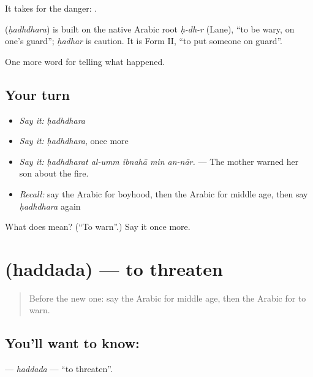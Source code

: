 It takes  for the danger:   .

\begin{cousinweb}
\textbf{} (\emph{ḥadhdhara}) is built on the native Arabic root \emph{ḥ-dh-r} (Lane), \textquotedblleft{}to be wary, on one's guard\textquotedblright{}; \emph{ḥadhar} is caution. It is Form II, \textquotedblleft{}to put someone on guard\textquotedblright{}.
\end{cousinweb}

\begin{grammarlens}[title={What you've built}]
One more word for telling what happened.
\end{grammarlens}

\subsection*{Your turn}
\begin{itemize}
\raggedright
  \item \emph{Say it:} \emph{ḥadhdhara}
  \item \emph{Say it:} \emph{ḥadhdhara}, once more
  \item \emph{Say it:} \emph{ḥadhdharat al-umm ibnahā min an-nār.} — The mother warned her son about the fire.
  \item \emph{Recall:} say the Arabic for boyhood, then the Arabic for middle age, then say \emph{ḥadhdhara} again
\end{itemize}

\begin{tcolorbox}[breakable,colback=teal!4,colframe=teal!35!black,title={Before you move on}]
What does  mean? (\textquotedblleft{}To warn\textquotedblright{}.) Say it once more.
\end{tcolorbox}
\section[\texorpdfstring{\ar{هدد} (haddada)}{هدد (haddada)}]{ (haddada) — to threaten}

\label{lesson:AR-C324-haddada-threaten}



\begin{quote}
Before the new one: say the Arabic for middle age, then the Arabic for to warn.
\end{quote}

\subsection*{You'll want to know: }
\textbf{} — \emph{haddada} — \textquotedblleft{}to threaten\textquotedblright{}.

